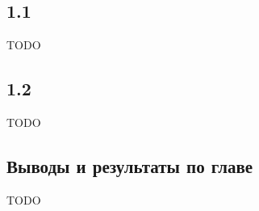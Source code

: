 \documentclass[../diploma.tex]{subfiles}
\begin{document}
\label{sec:1}

\subsection{1.1}

TODO

\subsection{1.2}

TODO

\subsection{Выводы и результаты по главе}

TODO
\end{document}
